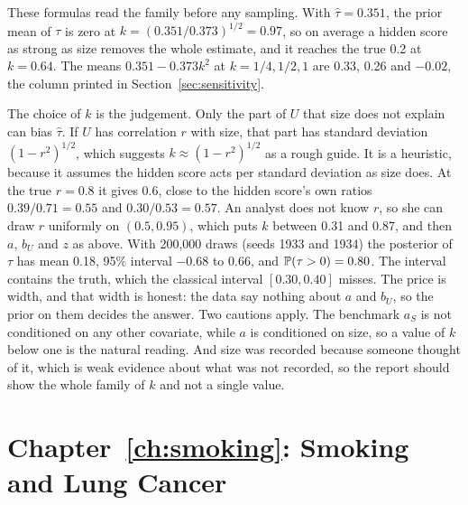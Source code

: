 These formulas read the family before any sampling. With $\hat\tau = 0.351$, the prior mean of $\tau$ is zero at $k = (0.351/0.373)^{1/2} = 0.97$, so on average a hidden score as strong as size removes the whole estimate, and it reaches the true 0.2 at $k = 0.64$. The means $0.351 - 0.373k^2$ at $k = 1/4, 1/2, 1$ are 0.33, 0.26 and $-0.02$, the column printed in Section~\ref{sec:sensitivity}.

The choice of $k$ is the judgement. Only the part of $U$ that size does not explain can bias $\hat\tau$. If $U$ has correlation $r$ with size, that part has standard deviation $(1 - r^2)^{1/2}$, which suggests $k \approx (1 - r^2)^{1/2}$ as a rough guide. It is a heuristic, because it assumes the hidden score acts per standard deviation as size does. At the true $r = 0.8$ it gives 0.6, close to the hidden score's own ratios $0.39/0.71 = 0.55$ and $0.30/0.53 = 0.57$. An analyst does not know $r$, so she can draw $r$ uniformly on $(0.5, 0.95)$, which puts $k$ between 0.31 and 0.87, and then $a$, $b_U$ and $z$ as above. With 200,000 draws (seeds 1933 and 1934) the posterior of $\tau$ has mean 0.18, 95\% interval $-0.68$ to 0.66, and $\mathbb{P}(\tau > 0) = 0.80$. The interval contains the truth, which the classical interval $[0.30, 0.40]$ misses. The price is width, and that width is honest: the data say nothing about $a$ and $b_U$, so the prior on them decides the answer. Two cautions apply. The benchmark $a_S$ is not conditioned on any other covariate, while $a$ is conditioned on size, so a value of $k$ below one is the natural reading. And size was recorded because someone thought of it, which is weak evidence about what was not recorded, so the report should show the whole family of $k$ and not a single value.

\section*{Chapter~\ref{ch:smoking}: Smoking and Lung Cancer}

